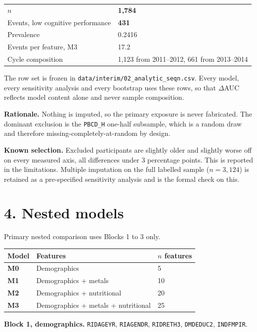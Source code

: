 \documentclass[11pt]{article}
\begin{document}
\begin{longtable}{L{7cm}L{6cm}}
\toprule
& \\
\midrule
\endhead
$n$ & \textbf{1,784} \\
Events, low cognitive performance & \textbf{431} \\
Prevalence & 0.2416 \\
Events per feature, M3 & 17.2 \\
Cycle composition & 1,123 from 2011--2012, 661 from 2013--2014 \\
\bottomrule
\end{longtable}

The row set is frozen in \texttt{data/interim/02\_analytic\_seqn.csv}. Every model, every sensitivity analysis and every bootstrap uses these rows, so that $\Delta$AUC reflects model content alone and never sample composition.

\textbf{Rationale.} Nothing is imputed, so the primary exposure is never fabricated. The dominant exclusion is the \texttt{PBCD\_H} one-half subsample, which is a random draw and therefore missing-completely-at-random by design.

\textbf{Known selection.} Excluded participants are slightly older and slightly worse off on every measured axis, all differences under 3 percentage points. This is reported in the limitations. Multiple imputation on the full labelled sample ($n = 3{,}124$) is retained as a pre-specified sensitivity analysis and is the formal check on this.

\section*{4. Nested models}

Primary nested comparison uses Blocks 1 to 3 only.

\begin{longtable}{L{3cm}L{7.5cm}L{2.5cm}}
\toprule
Model & Features & $n$ features \\
\midrule
\endhead
\textbf{M0} & Demographics & 5 \\
\textbf{M1} & Demographics + metals & 10 \\
\textbf{M2} & Demographics + nutritional & 20 \\
\textbf{M3} & Demographics + metals + nutritional & 25 \\
\bottomrule
\end{longtable}

\textbf{Block 1, demographics.} \texttt{RIDAGEYR}, \texttt{RIAGENDR}, \texttt{RIDRETH3}, \texttt{DMDEDUC2}, \texttt{INDFMPIR}.
\end{document}
